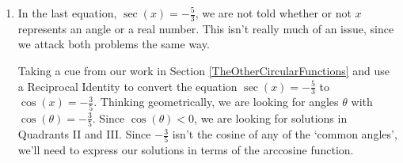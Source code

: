 \documentclass{ximera}
\begin{document}
\begin{example}
\begin{explanation}
\begin{enumerate}
\begin{image}
\end{image}


\item  In the last equation, $\sec(x) = -\frac{5}{3}$, we are not told whether or not $x$ represents an angle or a real number.  This isn't really much of an issue, since we attack both problems the same way.  

 

Taking a cue from our work in Section \ref{TheOtherCircularFunctions} and use a Reciprocal Identity to convert the equation $\sec(x) = -\frac{5}{3}$ to   $\cos(x) = -\frac{3}{5}$.    Thinking geometrically,  we are looking for angles $\theta$ with  $\cos(\theta) = -\frac{3}{5}$.  Since $\cos(\theta) < 0$, we are looking for solutions in  Quadrants II and III.   Since $-\frac{3}{5}$ isn't  the cosine of any of the `common angles', we'll need to express our solutions in terms of the arccosine function.  



\end{enumerate}
\end{explanation}
\end{example}
\end{document}
